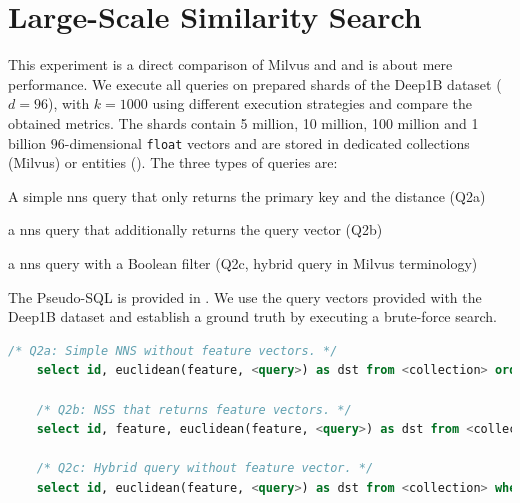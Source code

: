 \section{Large-Scale Similarity Search}
This experiment is a direct comparison of Milvus and \cottontail{} and is about mere performance. We execute all queries on prepared shards of the Deep1B \cite{Babenko:2016Efficient} dataset ($d=96$), with $k=1000$ using different execution strategies and compare the obtained metrics. The shards contain 5 million, 10 million, 100 million and 1 billion $96$-dimensional \texttt{float} vectors and are stored in dedicated collections (Milvus) or entities (\cottontail). The three types of queries are:
\begin{enumerate*}[label=(\roman*),itemjoin={{, }}, itemjoin*={{, and, }}, after={{.}}]
    \item A simple \acrshort{nns} query that only returns the primary key and the distance (Q2a)
    \item a \acrshort{nns} query that additionally returns the query vector (Q2b)
    \item a \acrshort{nns} query with a Boolean filter (Q2c, hybrid query in Milvus terminology)
\end{enumerate*} 
The Pseudo-SQL is provided in . We use the query vectors provided with the Deep1B dataset and establish a ground truth by executing a brute-force search.

\begin{lstlisting}[language=SQL, caption={Pseudo-SQL of the queries executed for this measurement.}, label=listing:big_nns_query, numbers=none]
    /* Q2a: Simple NNS without feature vectors. */
    select id, euclidean(feature, <query>) as dst from <collection> order by dst limit 1000
    
    /* Q2b: NSS that returns feature vectors. */
    select id, feature, euclidean(feature, <query>) as dst from <collection> order by dst limit 1000

    /* Q2c: Hybrid query without feature vector. */
    select id, euclidean(feature, <query>) as dst from <collection> where category = <category> order by dst limit 1000
\end{lstlisting}

